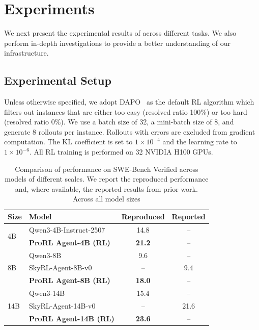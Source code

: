 
\section{Experiments}
We next present the experimental results of \prorlagent across different tasks. We also perform in-depth investigations to provide a better understanding of our infrastructure.

\subsection{Experimental Setup}

Unless otherwise specified, we adopt DAPO~\citep{yu2025dapoopensourcellmreinforcement} as the default RL algorithm which filters out instances that are either too easy (resolved ratio 100\%) or too hard (resolved ratio 0\%).
We use a batch size of 32, a mini-batch size of 8, and generate 8 rollouts per instance. 
Rollouts with errors are excluded from gradient computation. The KL coefficient is set to $1\times10^{-4}$ and the learning rate to $1\times10^{-6}$. All RL training is performed on 32 NVIDIA H100 GPUs. 

\begin{table}[htb]
\centering
\small
\caption{Comparison of performance on SWE-Bench Verified across models of different scales. We report the reproduced performance and, where available, the reported results from prior work. Across all model sizes}
\label{tab:swe_results}
\setlength{\tabcolsep}{6pt}
\renewcommand{\arraystretch}{1.1}
\begin{tabular*}{\linewidth}{@{\extracolsep{\fill}}llcc@{}}
\toprule
\textbf{Size} & \textbf{Model} & \textbf{Reproduced} & \textbf{Reported} \\
\midrule
\multirow{2}{*}{4B} 
& Qwen3-4B-Instruct-2507        & 14.8 & --   \\
& \cellcolor{gray!30} \textbf{ProRL Agent-4B (RL)}  & \cellcolor{gray!30}\textbf{21.2} & \cellcolor{gray!30}--   \\
\midrule
\multirow{3}{*}{8B} 
& Qwen3-8B                      & 9.6  & --   \\
& SkyRL-Agent-8B-v0             & --   & 9.4  \\
& \cellcolor{gray!30}\textbf{ProRL Agent-8B (RL)}  & \cellcolor{gray!30}\textbf{18.0} & \cellcolor{gray!30} --   \\
\midrule
\multirow{3}{*}{14B} 
& Qwen3-14B                     & 15.4 & --   \\
& SkyRL-Agent-14B-v0            & --   & 21.6 \\
& \cellcolor{gray!30} \textbf{ProRL Agent-14B (RL)} & \cellcolor{gray!30} \textbf{23.6} & \cellcolor{gray!30} --   \\
\bottomrule
\end{tabular*}
\end{table}


